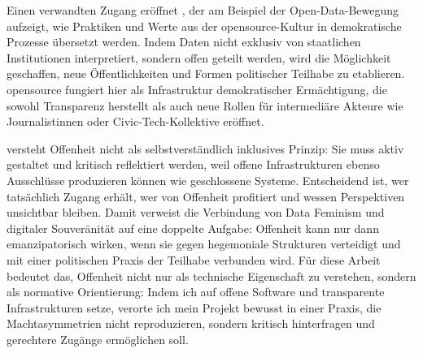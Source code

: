 Einen verwandten Zugang eröffnet \textcite{baackDataficationEmpowermentHow2015}, der am Beispiel der Open-Data-Bewegung aufzeigt, wie Praktiken und Werte aus der \gls{opensource}-Kultur in demokratische Prozesse übersetzt werden. Indem Daten nicht exklusiv von staatlichen Institutionen interpretiert, sondern offen geteilt werden, wird die Möglichkeit geschaffen, neue Öffentlichkeiten und Formen politischer Teilhabe zu etablieren. \gls{opensource} fungiert hier als Infrastruktur demokratischer Ermächtigung, die sowohl Transparenz herstellt als auch neue Rollen für intermediäre Akteure wie Journalist\genderstern innen oder Civic-Tech-Kollektive eröffnet.

\textcite{wilshireTimeRebootFeminism2024} versteht Offenheit nicht als selbstverständlich inklusives Prinzip: Sie muss aktiv gestaltet und kritisch reflektiert werden, weil offene Infrastrukturen ebenso Ausschlüsse produzieren können wie geschlossene Systeme. Entscheidend ist, wer tatsächlich Zugang erhält, wer von Offenheit profitiert und wessen Perspektiven unsichtbar bleiben. Damit verweist die Verbindung von Data Feminism und digitaler Souveränität auf eine doppelte Aufgabe: Offenheit kann nur dann emanzipatorisch wirken, wenn sie gegen hegemoniale Strukturen verteidigt und mit einer politischen Praxis der Teilhabe verbunden wird. Für diese Arbeit bedeutet das, Offenheit nicht nur als technische Eigenschaft zu verstehen, sondern als normative Orientierung: Indem ich auf offene Software und transparente Infrastrukturen setze, verorte ich mein Projekt bewusst in einer Praxis, die Machtasymmetrien nicht reproduzieren, sondern kritisch hinterfragen und gerechtere Zugänge ermöglichen soll.